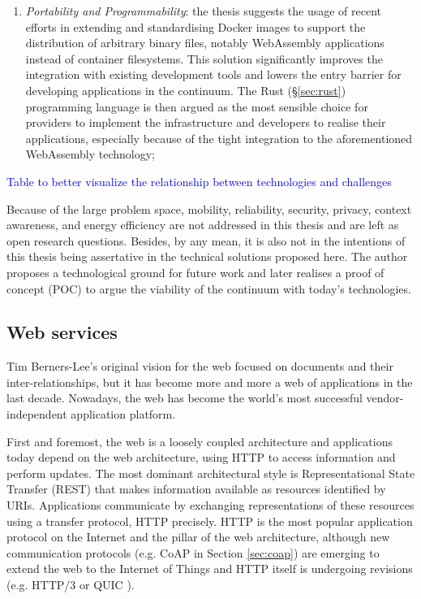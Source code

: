 \begin{enumerate}
    \item \emph{Portability and Programmability}: the thesis suggests the usage of recent efforts in extending and standardising Docker images to support the distribution of arbitrary binary files, notably WebAssembly applications instead of container filesystems. This solution significantly improves the integration with existing development tools and lowers the entry barrier for developing applications in the continuum. The Rust (§\ref{sec:rust}) programming language is then argued as the most sensible choice for providers to implement the infrastructure and developers to realise their applications, especially because of the tight integration to the aforementioned WebAssembly technology;
\end{enumerate}

\textcolor{blue}{Table to better visualize the relationship between technologies and challenges}

Because of the large problem space, mobility, reliability, security, privacy, context awareness, and energy efficiency are not addressed in this thesis and are left as open research questions. Besides, by any mean, it is also not in the intentions of this thesis being assertative in the technical solutions proposed here. The author proposes a technological ground for future work and later realises a proof of concept (POC) to argue the viability of the continuum with today's technologies.

\subsection{Web services}
\label{sec:web}

Tim Berners-Lee's original vision for the web focused on documents and their inter-relationships, but it has become more and more a web of applications in the last decade. Nowadays, the web has become the world's most successful vendor-independent application platform.

First and foremost, the web is a loosely coupled architecture and applications today depend on the web architecture, using HTTP to access information and perform updates. The most dominant architectural style is Representational State Transfer (REST) \cite{rest} that makes information available as resources identified by URIs. Applications communicate by exchanging representations of these resources using a transfer protocol, HTTP precisely. HTTP is the most popular application protocol on the Internet and the pillar of the web architecture, although new communication protocols (e.g. CoAP in Section \ref{sec:coap}) are emerging to extend the web to the Internet of Things and HTTP itself is undergoing revisions (e.g. HTTP/3 or QUIC \cite{quic}).

